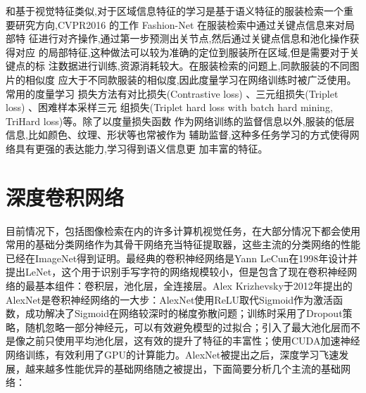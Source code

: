 和基于视觉特征类似,对于区域信息特征的学习是基于语义特征的服装检索一个重
要研究方向,CVPR2016 的工作 Fashion-Net\cite{liu2016deepfashion} 在服装检索中通过关键点信息来对局部特
征进行对齐操作,通过第一步预测出关节点,然后通过关键点信息和池化操作获得对应
的局部特征,这种做法可以较为准确的定位到服装所在区域,但是需要对于关键点的标
注数据进行训练,资源消耗较大。在服装检索的问题上,同款服装的不同图片的相似度
应大于不同款服装的相似度,因此度量学习在网络训练时被广泛使用。常用的度量学习
损失方法有对比损失(Contrastive loss)
、三元组损失(Triplet loss)
、困难样本采样三元
组损失(Triplet hard loss with batch hard mining, TriHard loss)等。除了以度量损失函数
作为网络训练的监督信息以外,服装的低层信息,比如颜色、纹理、形状等也常被作为
辅助监督,这种多任务学习的方式使得网络具有更强的表达能力,学习得到语义信息更
加丰富的特征。

\section{深度卷积网络}
目前情况下，包括图像检索在内的许多计算机视觉任务，在大部分情况下都会使用常用的基础分类网络作为其骨干网络充当特征提取器，这些主流的分类网络的性能已经在ImageNet得到证明。最经典的卷积神经网络是Yann LeCun在1998年设计并提出LeNet，这个用于识别手写字符的网络规模较小，但是包含了现在卷积神经网络的最基本组件：卷积层，池化层，全连接层。Alex Krizhevsky于2012年提出的AlexNet是卷积神经网络的一大步：AlexNet使用ReLU取代Sigmoid作为激活函数，成功解决了Sigmoid在网络较深时的梯度弥散问题；训练时采用了Dropout策略，随机忽略一部分神经元，可以有效避免模型的过拟合；引入了最大池化层而不是像之前只使用平均池化层，这有效的提升了特征的丰富性；使用CUDA加速神经网络训练，有效利用了GPU的计算能力。AlexNet被提出之后，深度学习飞速发展，越来越多性能优异的基础网络随之被提出，下面简要分析几个主流的基础网络：
